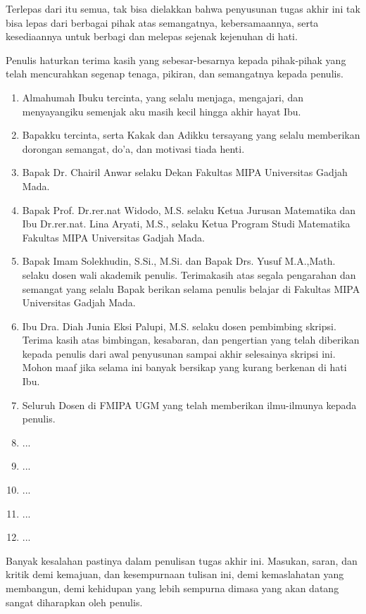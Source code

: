 \documentclass[skripsi]{unhasskripsi}
\theoremstyle{definition}
\begin{document}
    Terlepas dari itu semua, tak bisa dielakkan bahwa penyusunan tugas akhir ini tak bisa lepas dari berbagai pihak atas semangatnya, kebersamaannya, serta ke\-sediaannya untuk berbagi dan melepas sejenak kejenuhan di hati.

    Penulis haturkan terima kasih yang sebesar-besarnya kepada pihak-pihak yang telah mencurahkan segenap tenaga, pikiran, dan semangatnya kepada penulis.

    \begin{enumerate}
        \item Almahumah Ibuku tercinta, yang selalu menjaga, mengajari, dan menyayangiku semenjak aku masih kecil hingga akhir hayat Ibu.
        \item Bapakku tercinta, serta Kakak dan Adikku tersayang yang selalu memberikan dorongan semangat, do'a, dan motivasi tiada henti.
        \item Bapak Dr. Chairil Anwar selaku Dekan Fakultas MIPA Universitas Gadjah Mada.
        \item Bapak Prof. Dr.rer.nat Widodo, M.S. selaku Ketua Jurusan Matematika dan Ibu Dr.rer.nat. Lina Aryati, M.S., selaku Ketua Program Studi Matematika Fakultas MIPA Universitas Gadjah Mada.
        \item Bapak Imam Solekhudin, S.Si., M.Si. dan Bapak Drs. Yusuf M.A.,Math. selaku dosen wali akademik penulis. Terimakasih atas segala pengarahan dan semangat yang selalu Bapak berikan selama penulis belajar di Fakultas MIPA Universitas Gadjah Mada.
        \item Ibu Dra. Diah Junia Eksi Palupi, M.S. selaku dosen pembimbing skripsi. Terima kasih atas bimbingan, kesabaran, dan pengertian yang telah diberikan kepada penulis dari awal penyusunan sampai akhir selesainya skripsi ini. Mohon maaf jika selama ini banyak bersikap yang kurang berkenan di hati Ibu.
        \item Seluruh Dosen di FMIPA UGM yang telah memberikan ilmu-ilmunya kepada penulis.
        \item ...
        \item ...
        \item ...
        \item ...
        \item ...
    \end{enumerate}

    Banyak kesalahan pastinya dalam penulisan tugas akhir ini. Masukan, saran, dan kritik demi kemajuan, dan kesempurnaan tulisan ini, demi kemaslahatan yang membangun, demi kehidupan yang lebih sempurna dimasa yang akan datang sangat diharapkan oleh penulis.
\end{document}
